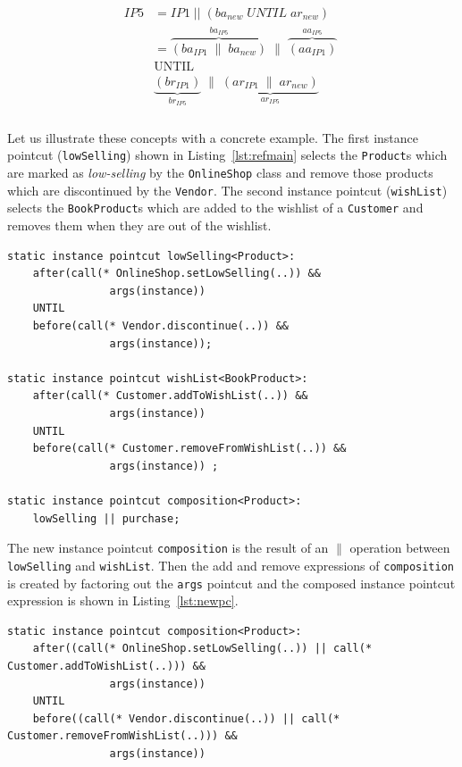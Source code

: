 \documentclass{acm_proc_article-sp}
\begin{document}
\begin{align}
\begin{split}
IP5 & = IP1\;||\;(ba_{new}\;UNTIL\;ar_{new}) \\
   & = \overbrace{\left( ba_{IP1}\;\|\;ba_{new}\right)}^{ba_{IP5}}\;\|\;\overbrace{\left( aa_{IP1} \right)}^{aa_{IP5}}\;\\
&\textrm{UNTIL} \\
&\underbrace{\left( br_{IP1}\right)}_{br_{IP5}}\;\|\;\underbrace{\left( ar_{IP1}\;\|\;ar_{new} \right)}_{ar_{IP5}}\;\\  
\end{split}
\end{align}

Let us illustrate these concepts with a concrete example. The first instance pointcut  (\texttt{lowSelling})  shown in Listing~\ref{lst:refmain} selects the \texttt{Product}s which are marked as \emph{low-selling} by the \texttt{OnlineShop} class and remove those products which are discontinued by the \texttt{Vendor}. The second instance pointcut (\texttt{wishList})  selects the \texttt{BookProduct}s which are added to the wishlist of a \texttt{Customer} and removes them when they are out of the wishlist.

\begin{lstlisting}[float=h!, caption={Two instance pointcuts composed to obtain a new one}, label={lst:refmain}]
static instance pointcut lowSelling<Product>: 
	after(call(* OnlineShop.setLowSelling(..)) &&
				args(instance)) 
	UNTIL 
	before(call(* Vendor.discontinue(..)) &&
				args(instance));
				
static instance pointcut wishList<BookProduct>: 
	after(call(* Customer.addToWishList(..)) &&
				args(instance)) 
	UNTIL 
	before(call(* Customer.removeFromWishList(..)) &&
				args(instance)) ;
				
static instance pointcut composition<Product>: 
	lowSelling || purchase;
\end{lstlisting}

The new instance pointcut \texttt{composition} is the result of an $\|$ operation between \texttt{lowSelling} and \texttt{wishList}. Then the add and remove expressions of \texttt{composition} is created by factoring out the \texttt{args} pointcut and the composed instance pointcut expression is shown in Listing~\ref{lst:newpc}. 

\begin{lstlisting}[float=h!, caption={The new instance pointcut after composition}, label={lst:newpc}]
static instance pointcut composition<Product>: 
	after((call(* OnlineShop.setLowSelling(..)) || call(* Customer.addToWishList(..))) && 
				args(instance)) 
	UNTIL 
	before((call(* Vendor.discontinue(..)) || call(* Customer.removeFromWishList(..))) && 
				args(instance))
\end{lstlisting}
\end{document}
